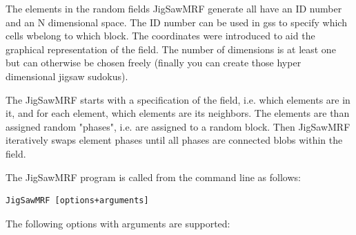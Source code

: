 \documentclass[12pt]{article}
\begin{document}
The elements in the random fields JigSawMRF generate all have an ID number and an N dimensional space. The ID number can be used in gss to specify which cells wbelong to which block. The coordinates were introduced to aid the graphical representation of the field. The number of dimensions is at least one but can otherwise be chosen freely (finally you can create those hyper dimensional jigsaw sudokus). 

The JigSawMRF starts with a specification of the field, i.e. which elements are in it, and for each element, which elements are its neighbors. The elements are than assigned random "phases", i.e. are assigned to a random block. Then JigSawMRF iteratively swaps element phases until all phases are connected blobs within the field.

The JigSawMRF program is called from the command line as follows:
\begin{verbatim}
JigSawMRF [options+arguments]
\end{verbatim}
The following options with arguments are supported:
\end{document}
